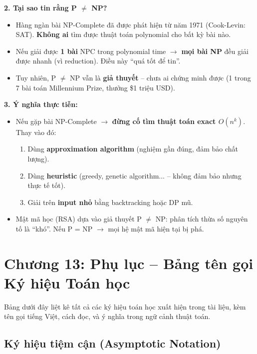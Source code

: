\documentclass[10pt]{article}
\begin{document}
\textbf{2. Tại sao tin rằng P $\neq$ NP?}
\begin{itemize}
\item Hàng ngàn bài NP-Complete đã được phát hiện từ năm 1971 (Cook-Levin: SAT). \textbf{Không ai} tìm được thuật toán polynomial cho bất kỳ bài nào.
\item Nếu giải được \textbf{1 bài} NPC trong polynomial time $\to$ \textbf{mọi bài NP} đều giải được nhanh (vì reduction). Điều này ``quá tốt để tin''.
\item Tuy nhiên, P $\neq$ NP vẫn là \textbf{giả thuyết} -- chưa ai chứng minh được (1 trong 7 bài toán Millennium Prize, thưởng \$1 triệu USD).
\end{itemize}

\textbf{3. Ý nghĩa thực tiễn:}
\begin{itemize}
\item Nếu gặp bài NP-Complete $\to$ \textbf{đừng cố tìm thuật toán exact $O(n^k)$}. Thay vào đó:
  \begin{enumerate}
  \item Dùng \textbf{approximation algorithm} (nghiệm gần đúng, đảm bảo chất lượng).
  \item Dùng \textbf{heuristic} (greedy, genetic algorithm... -- không đảm bảo nhưng thực tế tốt).
  \item Giải trên \textbf{input nhỏ} bằng backtracking hoặc DP mũ.
  \end{enumerate}
\item Mật mã học (RSA) dựa vào giả thuyết P $\neq$ NP: phân tích thừa số nguyên tố là ``khó''. Nếu P = NP $\to$ mọi hệ mật mã hiện tại bị phá.
\end{itemize}


\section{Chương 13: Phụ lục -- Bảng tên gọi Ký hiệu Toán học}
\label{phu-luc-ky-hieu}

Bảng dưới đây liệt kê tất cả các ký hiệu toán học xuất hiện trong tài liệu, kèm tên gọi tiếng Việt, cách đọc, và ý nghĩa trong ngữ cảnh thuật toán.

\subsection{Ký hiệu tiệm cận (Asymptotic Notation)}
\end{document}

